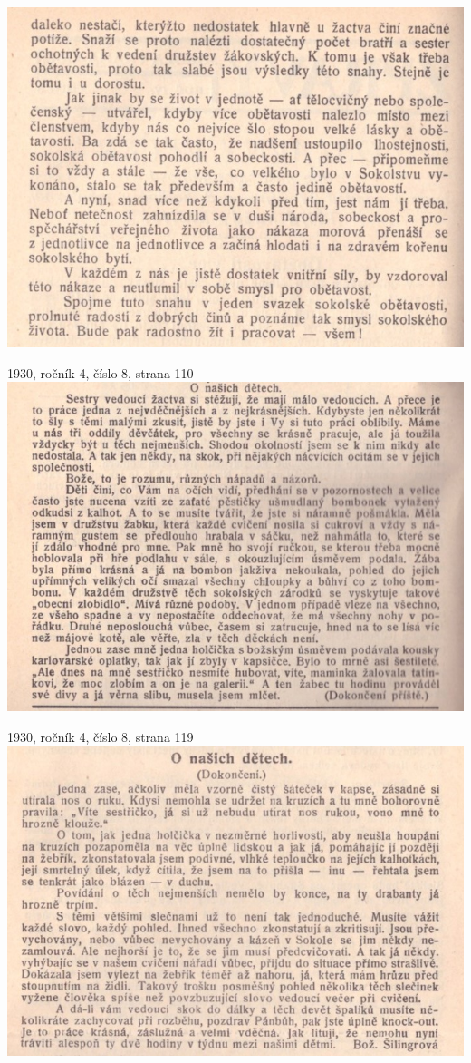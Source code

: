 \documentclass[11pt]{article}
\begin{document}
\includegraphics[width=\imagewidth]{original/1930/Skener_20250316 (11).jpg}

\vspace*{\baselineskip}
1930, ročník 4, číslo 8, strana 110 \\
\includegraphics[width=\imagewidth]{original/1930/Skener_20250316 (14).jpg}

1930, ročník 4, číslo 8, strana 119 \\
\includegraphics[width=\imagewidth]{original/1930/Skener_20250316 (13).jpg}
\end{document}
